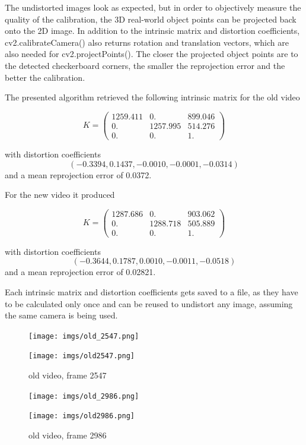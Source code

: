 \documentclass[bibliography=totoc]{scrartcl}
\begin{document}
The undistorted images look as expected, but in order to objectively measure the quality of the calibration, the 3D real-world object points can be projected back onto the 2D image.
In addition to the intrinsic matrix and distortion coefficients, cv2.calibrateCamera() also returns rotation and translation vectors, which are also needed for cv2.projectPoints().
The closer the projected object points are to the detected checkerboard corners, the smaller the reprojection error and the better the calibration.

\clearpage

The presented algorithm retrieved the following intrinsic matrix for the old video

$$
K =
\begin{pmatrix}
    1259.411 & 0. & 899.046 \\
    0. & 1257.995 & 514.276 \\
    0. & 0. & 1.
\end{pmatrix}
$$

with distortion coefficients
$$(-0.3394, 0.1437, -0.0010, -0.0001, -0.0314)$$
and a mean reprojection error of 0.0372.

For the new video it produced 

$$
K =
\begin{pmatrix}
    1287.686 & 0. & 903.062 \\
    0. & 1288.718 & 505.889 \\
    0. & 0. & 1.
\end{pmatrix}
$$

with distortion coefficients
$$(-0.3644, 0.1787, 0.0010, -0.0011, -0.0518)$$
and a mean reprojection error of 0.02821.

Each intrinsic matrix and distortion coefficients gets saved to a file, as they have to be calculated only once and can be reused to undistort any image, assuming the same camera is being used.


\begin{figure}[H]
	\texttt{[image: imgs/old\_2547.png]}
	\par\bigskip
	\texttt{[image: imgs/old2547.png]}
	\caption{old video, frame 2547}
	\label{fig:res1}
\end{figure}

\begin{figure}[H]
	\texttt{[image: imgs/old\_2986.png]}
	\par\bigskip
	\texttt{[image: imgs/old2986.png]}
	\caption{old video, frame 2986}
	\label{fig:res2}
\end{figure}
\end{document}
